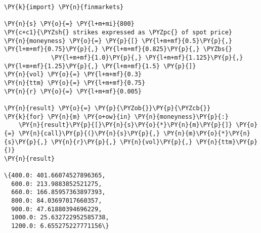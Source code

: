 \begin{Answer}
\begin{tcolorbox}[size=fbox, boxrule=1pt, colback=cellbackground, colframe=cellborder]
\begin{Verbatim}[commandchars=\\\{\}]
\PY{k}{import} \PY{n}{finmarkets}
        
\PY{n}{s} \PY{o}{=} \PY{l+m+mi}{800}
\PY{c+c1}{\PYZsh{} strikes expressed as \PYZpc{} of spot price}
\PY{n}{moneyness} \PY{o}{=} \PY{p}{[} \PY{l+m+mf}{0.5}\PY{p}{,} \PY{l+m+mf}{0.75}\PY{p}{,} \PY{l+m+mf}{0.825}\PY{p}{,} \PYZbs{}
             \PY{l+m+mf}{1.0}\PY{p}{,} \PY{l+m+mf}{1.125}\PY{p}{,} \PY{l+m+mf}{1.25}\PY{p}{,} \PY{l+m+mf}{1.5} \PY{p}{]}
\PY{n}{vol} \PY{o}{=} \PY{l+m+mf}{0.3}
\PY{n}{ttm} \PY{o}{=} \PY{l+m+mf}{0.75}
\PY{n}{r} \PY{o}{=} \PY{l+m+mf}{0.005}

\PY{n}{result} \PY{o}{=} \PY{p}{\PYZob{}}\PY{p}{\PYZcb{}}
\PY{k}{for} \PY{n}{m} \PY{o+ow}{in} \PY{n}{moneyness}\PY{p}{:}
    \PY{n}{result}\PY{p}{[}\PY{n}{s}\PY{o}{*}\PY{n}{m}\PY{p}{]} \PY{o}{=} \PY{n}{call}\PY{p}{(}\PY{n}{s}\PY{p}{,} \PY{n}{m}\PY{o}{*}\PY{n}{s}\PY{p}{,} \PY{n}{r}\PY{p}{,} \PY{n}{vol}\PY{p}{,} \PY{n}{ttm}\PY{p}{)}
\PY{n}{result}

\{400.0: 401.66074527896365,
  600.0: 213.9883852521275,
  660.0: 166.85957363897393,
  800.0: 84.03697017660357,
  900.0: 47.61880394696229,
  1000.0: 25.632722952585738,
  1200.0: 6.655275227771156\}
\end{Verbatim}
\end{tcolorbox}
\end{Answer}

